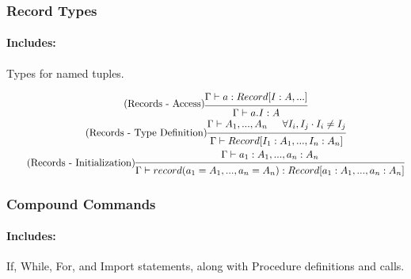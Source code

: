 \documentclass{article}
\begin{document}
\subsubsection{Record Types}
\paragraph{Includes:} Types for named tuples.

\begin{gather}
\tag{Records - Access}
\begin{prooftree}
\hypo{\Gamma \vdash a: Record[I:A, ...]}
\infer1{\Gamma \vdash a.I: A}
\end{prooftree}
\\
\tag{Records - Type Definition}
\begin{prooftree}
\hypo{\Gamma \vdash A_1, ..., A_n}
\hypo{\forall I_i, I_j \cdot I_i \neq I_j}
\infer2{\Gamma \vdash Record[I_1: A_1, ..., I_n: A_n]}
\end{prooftree}
\\
\tag{Records - Initialization}
\begin{prooftree}
\hypo{\Gamma \vdash a_1: A_1, ..., a_n: A_n}
\infer1{\Gamma \vdash record(a_1=A_1, ..., a_n=A_n): Record[a_1: A_1, ..., a_n:A_n]}
\end{prooftree}
\end{gather}

\subsubsection{Compound Commands}
\paragraph{Includes:} If, While, For, and Import statements, along with Procedure definitions and calls.
\end{document}
